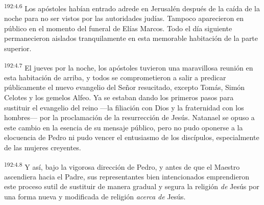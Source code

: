 \par
\textsuperscript{192:4.6} Los apóstoles habían entrado adrede en Jerusalén después de la caída de la noche para no ser vistos por las autoridades judías. Tampoco aparecieron en público en el momento del funeral de Elías Marcos. Todo el día siguiente permanecieron aislados tranquilamente en esta memorable habitación de la parte superior.

\par
\textsuperscript{192:4.7} El jueves por la noche, los apóstoles tuvieron una maravillosa reunión en esta habitación de arriba, y todos se comprometieron a salir a predicar públicamente el nuevo evangelio del Señor resucitado, excepto Tomás, Simón Celotes y los gemelos Alfeo. Ya se estaban dando los primeros pasos para sustituir el evangelio del reino ---la filiación con Dios y la fraternidad con los hombres--- por la proclamación de la resurrección de Jesús. Natanael se opuso a este cambio en la esencia de su mensaje público, pero no pudo oponerse a la elocuencia de Pedro ni pudo vencer el entusiasmo de los discípulos, especialmente de las mujeres creyentes.

\par
\textsuperscript{192:4.8} Y así, bajo la vigorosa dirección de Pedro, y antes de que el Maestro ascendiera hacia el Padre, sus representantes bien intencionados emprendieron este proceso sutil de sustituir de manera gradual y segura la religión \textit{de} Jesús por una forma nueva y modificada de religión \textit{acerca de} Jesús.